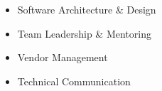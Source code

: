 %
%
%

\twocolumnsection
{
\begin{skills}
\end{skills}}
{
\vspace{1em}
\begin{itemize}
    \item Software Architecture \& Design
	\item Team Leadership \& Mentoring
	\item Vendor Management
    \item Technical Communication
\end{itemize}
}
